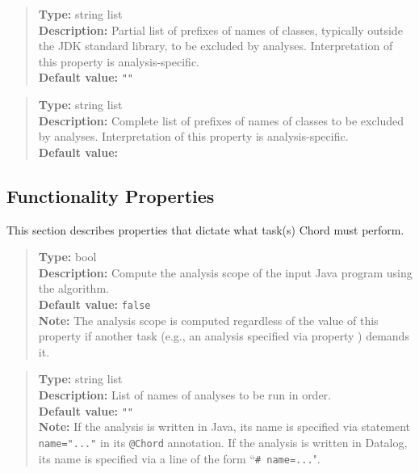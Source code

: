 \begin{quote}
{\bf Type:} string list \\
{\bf Description:} Partial list of prefixes of names of classes, typically outside the JDK standard library, to be excluded by analyses.  Interpretation of this property is analysis-specific. \\
{\bf Default value:} {\tt ""}
\end{quote}

\begin{quote}
{\bf Type:} string list \\
{\bf Description:} Complete list of prefixes of names of classes to be excluded by analyses.  Interpretation of this property is analysis-specific. \\
{\bf Default value:} 
\end{quote}

\subsection{Functionality Properties}
\label{sec:func-props}

This section describes properties that dictate what task(s) Chord must perform.

\begin{quote}
{\bf Type:} bool \\
{\bf Description:} Compute the analysis scope of the input Java program using the algorithm. \\
{\bf Default value:} {\tt false} \\
{\bf Note:} The analysis scope is computed regardless of the value of this property if another task (e.g., an analysis specified via property ) demands it.
\end{quote}

\begin{quote}
{\bf Type:} string list  \\
{\bf Description:} List of names of analyses to be run in order. \\
{\bf Default value:} {\tt ""} \\
{\bf Note:} If the analysis is written in Java, its name is specified via statement {\tt name="..."} in its {\tt @Chord} annotation.  If the analysis is written in Datalog, its name is specified via a line of the form ``{\tt \# name=...}".
\end{quote}

